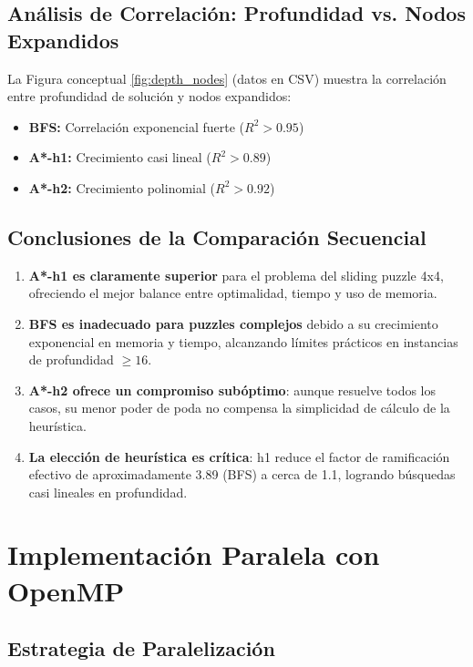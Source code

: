 \documentclass[12pt,a4paper]{article}
\begin{document}
\subsection{Análisis de Correlación: Profundidad vs. Nodos Expandidos}

La Figura conceptual \ref{fig:depth_nodes} (datos en CSV) muestra la correlación entre profundidad de solución y nodos expandidos:

\begin{itemize}
    \item \textbf{BFS:} Correlación exponencial fuerte ($R^2 > 0.95$)
    \item \textbf{A*-h1:} Crecimiento casi lineal ($R^2 > 0.89$)
    \item \textbf{A*-h2:} Crecimiento polinomial ($R^2 > 0.92$)
\end{itemize}

\subsection{Conclusiones de la Comparación Secuencial}

\begin{enumerate}
    \item \textbf{A*-h1 es claramente superior} para el problema del sliding puzzle 4x4, ofreciendo el mejor balance entre optimalidad, tiempo y uso de memoria.
    
    \item \textbf{BFS es inadecuado para puzzles complejos} debido a su crecimiento exponencial en memoria y tiempo, alcanzando límites prácticos en instancias de profundidad $\geq 16$.
    
    \item \textbf{A*-h2 ofrece un compromiso subóptimo}: aunque resuelve todos los casos, su menor poder de poda no compensa la simplicidad de cálculo de la heurística.
    
    \item \textbf{La elección de heurística es crítica}: h1 reduce el factor de ramificación efectivo de aproximadamente 3.89 (BFS) a cerca de 1.1, logrando búsquedas casi lineales en profundidad.
\end{enumerate}

\section{Implementación Paralela con OpenMP}

\subsection{Estrategia de Paralelización}
\end{document}

